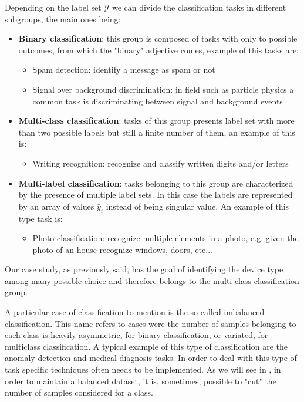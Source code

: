 Depending on the label set $\mathcal{Y}$ we can divide the classification tasks in different subgroups, the main ones being:
\begin{itemize}[]
    \item \textbf{Binary classification}: this group is composed of tasks with only to possible outcomes, from which the "binary" adjective comes, example of this tasks are:
    \begin{itemize}
        \item Spam detection: identify a message as spam or not
    \item Signal over background discrimination: in field such as particle physics a common task is discriminating between signal and background events
    \end{itemize}
    \item \textbf{Multi-class classification}: tasks of this group presents label set with more than two possible labels but still a finite number of them, an example of this is:
    \begin{itemize}
        \item Writing recognition: recognize and classify written digits and/or letters
    \end{itemize}
    \item \textbf{Multi-label classification}: tasks belonging to this group are characterized by the presence of multiple label
    sets. In this case the labels are represented by an array of values $\bar{y}_i$ instead of being singular value. An example of this type task is:
    \begin{itemize}
        \item Photo classification: recognize multiple elements in a photo, e.g. given the photo of an house recognize windows, doors, etc...
    \end{itemize}
\end{itemize}

Our case study, as previously said, has the goal of identifying the device type among many possible choice and therefore belongs to the multi-class classification group.

A particular case of classification to mention is the so-called imbalanced classification. This name refers to cases were the number of samples belonging to each class is heavily asymmetric, for binary classification, or variated, for multiclass classification. A typical example of this type of classification are the anomaly detection and medical diagnosis tasks. In order to deal with this type of task specific techniques often needs to be implemented\cite{imbclasf}. As we will see in , in order to maintain a balanced dataset, it is, sometimes, possible to "cut" the number of samples considered for a class.




